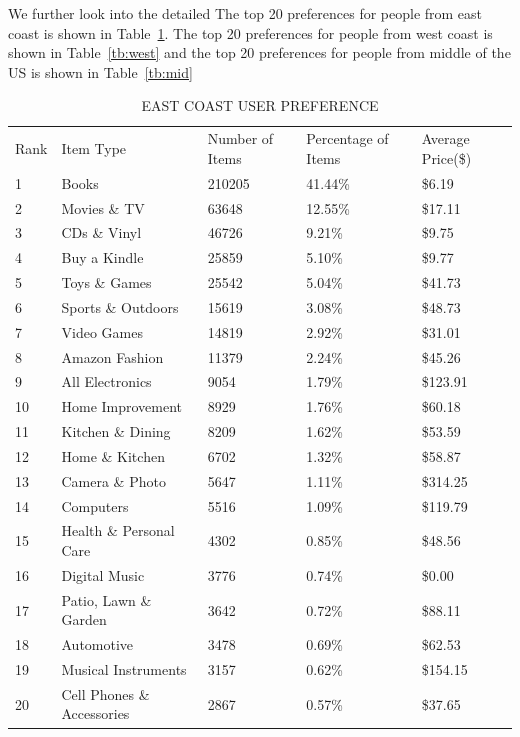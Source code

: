 We further look into the detailed The top 20 preferences for people from east coast is shown in Table~\ref{tb:east}. The top 20 preferences for people from west coast is shown in Table~\ref{tb:west} and the top 20 preferences for people from middle of the US is shown in Table~\ref{tb:mid}

\begin{table}[!htbp]
\centering
\caption{EAST COAST USER PREFERENCE}
\label{tb:east}
\begin{adjustbox}{max width=.5\textwidth}
\begin{tabular}{lllll}
Rank & Item Type          & Number of Items & Percentage of Items & Average Price(\$) \\
1 & Books & 210205 & 41.44\% & \$6.19 \\
2 & Movies \& TV & 63648 & 12.55\% & \$17.11 \\
3 & CDs \& Vinyl & 46726 & 9.21\% & \$9.75 \\
4 & Buy a Kindle & 25859 & 5.10\% & \$9.77 \\
5 & Toys \& Games & 25542 & 5.04\% & \$41.73 \\
6 & Sports \& Outdoors & 15619 & 3.08\% & \$48.73 \\
7 & Video Games & 14819 & 2.92\% & \$31.01 \\
8 & Amazon Fashion & 11379 & 2.24\% & \$45.26 \\
9 & All Electronics & 9054 & 1.79\% & \$123.91 \\
10 & Home Improvement & 8929 & 1.76\% & \$60.18 \\
11 & Kitchen \& Dining & 8209 & 1.62\% & \$53.59 \\
12 & Home \& Kitchen & 6702 & 1.32\% & \$58.87 \\
13 & Camera \& Photo & 5647 & 1.11\% & \$314.25 \\
14 & Computers & 5516 & 1.09\% & \$119.79 \\
15 & Health \& Personal Care & 4302 & 0.85\% & \$48.56 \\
16 & Digital Music & 3776 & 0.74\% & \$0.00 \\
17 & Patio, Lawn \& Garden & 3642 & 0.72\% & \$88.11 \\
18 & Automotive & 3478 & 0.69\% & \$62.53 \\
19 & Musical Instruments & 3157 & 0.62\% & \$154.15 \\
20 & Cell Phones \& Accessories & 2867 & 0.57\% & \$37.65 \\
\end{tabular}
\end{adjustbox}
\end{table}

